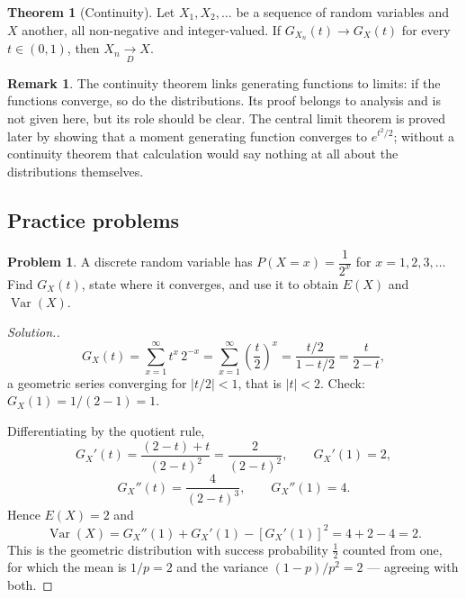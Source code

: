 \documentclass[11pt,a4paper]{article}
\theoremstyle{definition}
\newtheorem{thm}{Theorem}[subsection]
\newtheorem*{remark}{Remark}
\newtheorem{problemx}{Problem}[subsection]
\newenvironment{problem}{\begin{problemx}}{\end{problemx}}
\newenvironment{solution}
  {\renewcommand{\qedsymbol}{}\begin{proof}[\textit{Solution}.]}
  {\end{proof}}
\DeclareMathOperator{\Var}{Var}
\begin{document}
\begin{thm}[Continuity]
Let $X_1, X_2, \dots$ be a sequence of random variables and $X$ another, all
non-negative and integer-valued. If $G_{X_n}(t) \rightarrow G_X(t)$ for every
$t\in(0,1)$, then $X_n \underset{D}{\longrightarrow} X$.
\end{thm}

\begin{remark}
The continuity theorem links generating functions to limits: if the functions
converge, so do the distributions. Its proof
belongs to analysis and is not given here, but its role should be clear. The
central limit theorem is proved later by showing that a moment generating
function converges to $e^{t^{2}/2}$; without a continuity theorem that
calculation would say nothing at all about the distributions themselves.
\end{remark}



\subsection{Practice problems}

\begin{problem}
A discrete random variable has $P(X=x) = \dfrac{1}{2^{x}}$ for $x=1,2,3,\dots$
Find $G_X(t)$, state where it converges, and use it to obtain $E(X)$ and
$\Var(X)$.
\end{problem}
\begin{solution}
$$G_X(t) = \sum_{x=1}^{\infty} t^{x}\,2^{-x}
= \sum_{x=1}^{\infty}\left(\frac{t}{2}\right)^{x}
= \frac{t/2}{1-t/2} = \frac{t}{2-t},$$
a geometric series converging for $\left|t/2\right|<1$, that is
$\left|t\right|<2$. Check: $G_X(1) = 1/(2-1) = 1$.

Differentiating by the quotient rule,
$$G_X'(t) = \frac{(2-t) + t}{(2-t)^{2}} = \frac{2}{(2-t)^{2}},
\qquad G_X'(1) = 2 ,$$
$$G_X''(t) = \frac{4}{(2-t)^{3}},\qquad G_X''(1) = 4 .$$
Hence $E(X) = 2$ and
$$\Var(X) = G_X''(1) + G_X'(1) - \left[G_X'(1)\right]^{2} = 4 + 2 - 4 = 2 .$$
This is the geometric distribution with success probability $\tfrac12$ counted
from one, for which the mean is $1/p = 2$ and the variance
$(1-p)/p^{2} = 2$ --- agreeing with both.
\end{solution}
\end{document}

